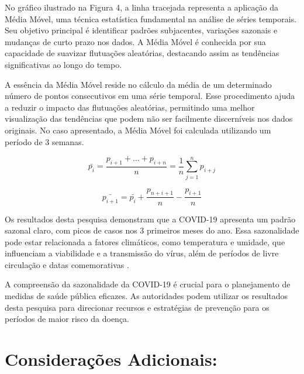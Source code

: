 \documentclass[a4paper,12pt]{report}
\begin{document}

No gráfico ilustrado na Figura 4, a linha tracejada representa a aplicação da Média Móvel, uma técnica estatística fundamental na análise de séries temporais. Seu objetivo principal é identificar padrões subjacentes, variações sazonais e mudanças de curto prazo nos dados. A Média Móvel é conhecida por sua capacidade de suavizar flutuações aleatórias, destacando assim as tendências significativas ao longo do tempo.

A essência da Média Móvel reside no cálculo da média de um determinado número de pontos consecutivos em uma série temporal. Esse procedimento ajuda a reduzir o impacto das flutuações aleatórias, permitindo uma melhor visualização das tendências que podem não ser facilmente discerníveis nos dados originais. No caso apresentado, a Média Móvel foi calculada utilizando um período de 3 semanas.

\begin{center}
    \begin{equation}
        \bar{p_i} = \frac{p_{i+1}+ \ldots + p_{i+n}}{n} = \frac{1}{n}\sum_{j=1}^{n}p_{i+j} 
    \end{equation}
\end{center}

\begin{center}
    \begin{equation}
        \bar{p_{i+1}} = \bar{p_i} + \frac{p_{n+i+1}}{n} - \frac{p_{i+1}}{n}
    \end{equation}
\end{center}

Os resultados desta pesquisa demonstram que a COVID-19 apresenta um padrão sazonal claro, com picos de casos nos 3 primeiros meses do ano. Essa sazonalidade pode estar relacionada a fatores climáticos, como temperatura e umidade, que influenciam a viabilidade e a transmissão do vírus, além de períodos de livre circulação e datas comemorativas \cite{xavier2022sazonalidade}.

A compreensão da sazonalidade da COVID-19 é crucial para o planejamento de medidas de saúde pública eficazes. As autoridades podem utilizar os resultados desta pesquisa para direcionar recursos e estratégias de prevenção para os períodos de maior risco da doença.

\section*{Considerações Adicionais:}
\end{document}
